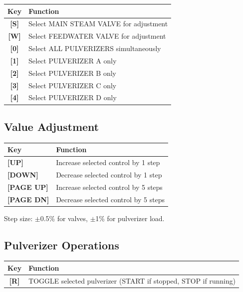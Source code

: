 \documentclass[10pt,a5paper]{article}
\newcommand{\key}[1]{\textbf{[#1]}}
\begin{document}
\begin{center}
\begin{tabular}{cl}
\toprule
\textbf{Key} & \textbf{Function} \\
\midrule
\key{S} & Select MAIN STEAM VALVE for adjustment \\
\key{W} & Select FEEDWATER VALVE for adjustment \\
\key{0} & Select ALL PULVERIZERS simultaneously \\
\key{1} & Select PULVERIZER A only \\
\key{2} & Select PULVERIZER B only \\
\key{3} & Select PULVERIZER C only \\
\key{4} & Select PULVERIZER D only \\
\bottomrule
\end{tabular}
\end{center}

\subsection{Value Adjustment}

\begin{center}
\begin{tabular}{ll}
\toprule
\textbf{Key} & \textbf{Function} \\
\midrule
\key{UP}      & Increase selected control by 1 step \\
\key{DOWN}    & Decrease selected control by 1 step \\
\key{PAGE UP} & Increase selected control by 5 steps \\
\key{PAGE DN} & Decrease selected control by 5 steps \\
\bottomrule
\end{tabular}
\end{center}

Step size: $\pm$0.5\% for valves, $\pm$1\% for pulverizer load.

\subsection{Pulverizer Operations}

\begin{center}
\begin{tabular}{cl}
\toprule
\textbf{Key} & \textbf{Function} \\
\midrule
\key{R} & TOGGLE selected pulverizer (START if stopped, STOP if running) \\
\bottomrule
\end{tabular}
\end{center}
\end{document}
